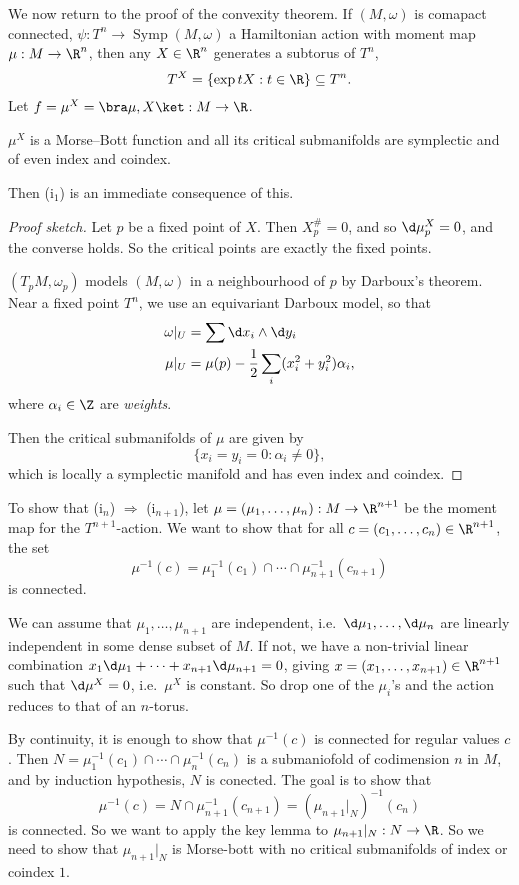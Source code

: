 \documentclass[a4paper]{article}
\DeclareMathOperator{\Symp}{Symp}
\begin{document}
We now return to the proof of the convexity theorem. If $(M, \omega)$ is comapact connected, $\psi: T^n \to \Symp(M, \omega)$ a Hamiltonian action with moment map $\mu: M \to \R^n$, then any $X \in \R^n$ generates a subtorus of $T^n$,
\[
  T^X = \{\exp tX : t \in \R\} \subseteq T^n.
\]
Let $f = \mu^X = \bra \mu, X\ket : M \to \R$.
\begin{claim}
  $\mu^X$ is a Morse--Bott function and all its critical submanifolds are symplectic and of even index and coindex.
\end{claim}
Then (i$_1$) is an immediate consequence of this.

\begin{proof}[Proof sketch]
  Let $p$ be a fixed point of $X$. Then $X^\#_p = 0$, and so $\d \mu^X_p = 0$, and the converse holds. So the critical points are exactly the fixed points.

  $(T_p M, \omega_p)$ models $(M, \omega)$ in a neighbourhood of $p$ by Darboux's theorem. Near a fixed point $T^n$, we use an equivariant Darboux model, so that
  \begin{align*}
    \omega|_U &= \sum \d x_i \wedge \d y_i\\
    \mu|_U &= \mu(p) - \frac{1}{2} \sum_i (x_i^2 + y_i^2) \alpha_i,
  \end{align*}
  where $\alpha_i \in \Z$ are \emph{weights}.

  Then the critical submanifolds of $\mu$ are given by
  \[
     \{x_i = y_i = 0 : \alpha_i \not= 0\},
  \]
  which is locally a symplectic manifold and has even index and coindex.
\end{proof}

To show that (i$_n$) $\Rightarrow$ (i$_{n + 1}$), let $\mu = (\mu_1, \ldots, \mu_n): M \to \R^{n + 1}$ be the moment map for the $T^{n + 1}$-action. We want to show that for all $c = (c_1, \ldots, c_n) \in \R^{n + 1}$, the set
\[
  \mu^{-1}(c) = \mu_1^{-1}(c_1) \cap \cdots \cap \mu_{n + 1}^{-1}(c_{n + 1})
\]
is connected.

We can assume that $\mu_1, \ldots, \mu_{n + 1}$ are independent, i.e.\ $\d \mu_1, \ldots, \d\mu_{n}$ are linearly independent in some dense subset of $M$. If not, we have a non-trivial linear combination $x_1 \d \mu_1 + \cdots + x_{n + 1} \d \mu_{n + 1} = 0$, giving $x = (x_1, \ldots, x_{n +1}) \in \R^{n + 1}$ such that $\d \mu^X = 0$, i.e.\ $\mu^X$ is constant. So drop one of the $\mu_i$'s and the action reduces to that of an $n$-torus. %

By continuity, it is enough to show that $\mu^{-1}(c)$ is connected for regular values $c$. Then $N = \mu_1^{-1}(c_1) \cap \cdots \cap \mu_n^{-1}(c_n)$ is a submaniofold of codimension $n$ in $M$, and by induction hypothesis, $N$ is conected. The goal is to show that
\[
  \mu^{-1}(c) = N \cap \mu_{n + 1}^{-1}(c_{n + 1}) = (\mu_{n + 1}|_N)^{-1}(c_n)
\]
is connected. So we want to apply the key lemma to $\mu_{n + 1}|_N: N \to \R$. So we need to show that $\mu_{n + 1}|_N$ is Morse-bott with no critical submanifolds of index or coindex $1$.
\end{document}
